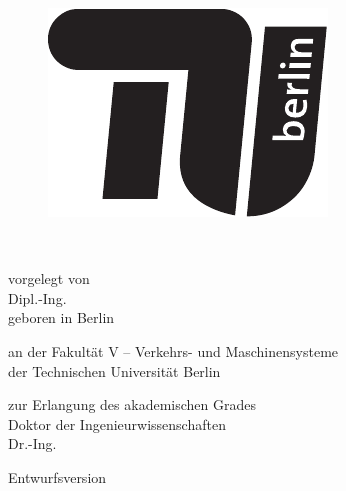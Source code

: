 
\thispagestyle{empty}

\begin{flushright}

	\begin{figure}[!h]
  	\begin{minipage}{1.8\linewidth}
	\begin{center}
	\includegraphics[scale=0.6]{chapters/title/TU-logo-kurz-1c-schwarz.pdf}
  	\end{center}
  	\end{minipage}
	\end{figure}

	\vspace{30mm}

	\LARGE

	\textbf{\hspace{60mm}\Title} \\[2cm]

	\hrulefill

	\large
	vorgelegt von\\

	Dipl.-Ing. \Autor\\
	geboren in Berlin\\
	\vspace{10mm}

	an der Fakult\"at V -- Verkehrs- und Maschinensysteme\\
	der Technischen Universit\"at Berlin

	zur Erlangung des akademischen Grades\\
	Doktor der Ingenieurwissenschaften\\
	Dr.-Ing.\\
	\vspace{5mm}

	Entwurfsversion \\


\end{flushright}

